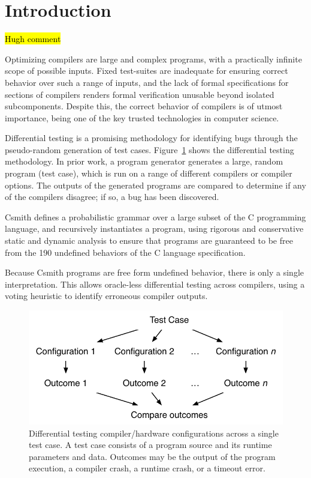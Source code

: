 \section{Introduction}\label{sec:intro}

\hl{Hugh comment}

\noindent
Optimizing compilers are large and complex programs, with a practically infinite scope of possible inputs. Fixed test-suites are inadequate for ensuring correct behavior over such a range of inputs, and the lack of formal specifications for sections of compilers renders formal verification unusable beyond isolated subcomponents. Despite this, the correct behavior of compilers is of utmost importance, being one of the key trusted technologies in computer science.

Differential testing is a promising methodology for identifying bugs through the pseudo-random generation of test cases. Figure~\ref{fig:difftest} shows the differential testing methodology. In prior work, a program generator generates a large, random program (test case), which is run on a range of different compilers or compiler options. The outputs of the generated programs are compared to determine if any of the compilers disagree; if so, a bug has been discovered.

Csmith defines a probabilistic grammar over a large subset of the C programming language, and recursively instantiates a program, using rigorous and conservative static and dynamic analysis to ensure that programs are guaranteed to be free from the 190 undefined behaviors of the C language specification.

Because Csmith programs are free form undefined behavior, there is only a single interpretation. This allows oracle-less differential testing across compilers, using a voting heuristic to identify erroneous compiler outputs.

\begin{figure}
	\centering
	\includegraphics[width=.85\columnwidth]{img/difftest} %
	\caption{%
		Differential testing compiler/hardware configurations across a single test case. A test case consists of a program source and its runtime parameters and data. Outcomes may be the output of the program execution, a compiler crash, a runtime crash, or a timeout error.%
	}%
	\label{fig:difftest}
\end{figure}

